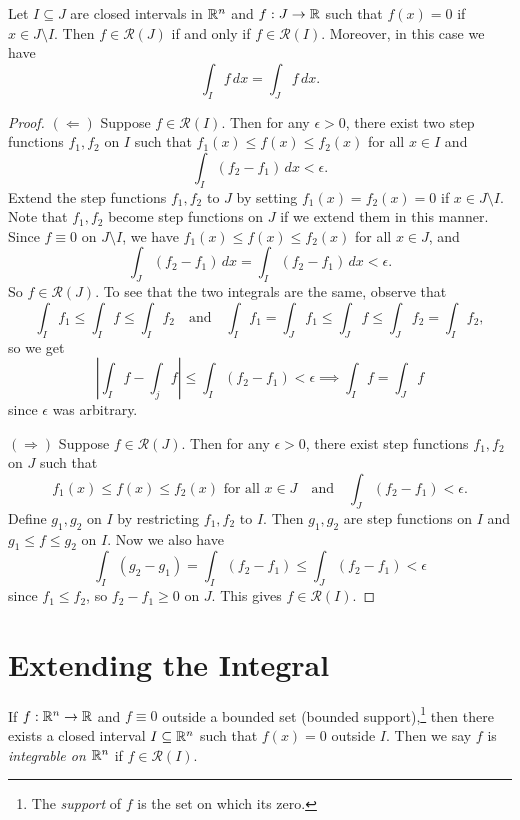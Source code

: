 \begin{corollary}
  Let $I \subseteq J$ are closed intervals in $\mathbb{R}^n$ and
  $f : J \to \mathbb{R}$ such that $f(x) = 0$ if
  $x \in J \setminus I$. Then $f \in \mathcal{R}(J)$
  if and only if $f \in \mathcal{R}(I)$. Moreover,
  in this case we have
  \[
    \int_{I} f\, dx = \int_{J} f\, dx.
  \]
\end{corollary}

\begin{proof}
  $(\Leftarrow)$ Suppose $f \in \mathcal{R}(I)$. Then for
  any $\epsilon > 0$,
  there exist two step functions $f_1, f_2$ on $I$ such
  that $f_1(x) \le f(x) \le f_2(x)$ for all $x \in I$ and
  \[
    \int_{I} (f_2 - f_1)\, dx < \epsilon.
  \]
  Extend the step functions $f_1, f_2$ to $J$ by setting
  $f_1(x) = f_2(x) = 0$ if $x \in J \setminus I$. Note
  that $f_1, f_2$ become step functions on $J$ if we
  extend them in this manner. Since $f \equiv 0$ on
  $J \setminus I$, we have
  $f_1(x) \le f(x) \le f_2(x)$ for all $x \in J$, and
  \[
    \int_J (f_2 - f_1)\, dx = \int_I (f_2 - f_1)\, dx < \epsilon.
  \]
  So $f \in \mathcal{R}(J)$. To see that the two integrals
  are the same, observe that
  \[
    \int_{I} f_1 \le \int_{I} f \le \int_{I} f_2
    \quad \text{and} \quad
    \int_I f_1 = \int_{J} f_1 \le \int_{J} f \le \int_{J} f_2 = \int_I f_2,
  \]
  so we get
  \[
  \left|\int_I f - \int_j f\right|
  \le \int_I (f_2 - f_1) < \epsilon \implies
    \int_I f = \int_J f
  \]
  since $\epsilon$ was arbitrary.

  $(\Rightarrow)$ Suppose $f \in \mathcal{R}(J)$. Then
  for any $\epsilon > 0$, there exist step functions
  $f_1, f_2$ on $J$ such that
  \[
    f_1(x) \le f(x) \le f_2(x) \text{ for all } x \in J \quad \text{and} \quad
    \int_{J} (f_2 - f_1) < \epsilon.
  \]
  Define $g_1, g_2$ on $I$ by restricting $f_1, f_2$ to $I$.
  Then $g_1, g_2$ are step functions on $I$ and
  $g_1 \le f \le g_2$ on $I$. Now we also have
  \[
    \int_I (g_2 - g_1) = \int_I (f_2 - f_1)
    \le \int_J (f_2 - f_1) < \epsilon
  \]
  since $f_1 \le f_2$, so $f_2 - f_1 \ge 0$ on $J$.
  This gives $f \in \mathcal{R}(I)$.
\end{proof}

\section{Extending the Integral}

\begin{definition}
If $f : \mathbb{R}^n \to \mathbb{R}$ and $f \equiv 0$ outside
a bounded set (bounded support),\footnote{The \emph{support} of $f$ is the set on which its zero.} then there exists a closed
interval $I \subseteq \mathbb{R}^n$ such that
$f(x) = 0$ outside $I$. Then we say $f$ is
\emph{integrable on $\mathbb{R}^n$} if $f \in \mathcal{R}(I)$.
\end{definition}


